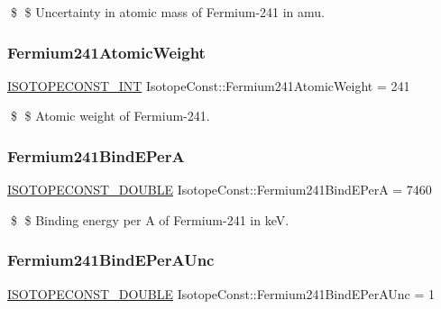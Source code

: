 \$ \$ Uncertainty in atomic mass of Fermium-\/241 in amu. \mbox{\label{group___isotope_const-_fermium-_fm241_gac48969b95bcbb3997af04f0e85ccc840}} 
\subsubsection{\texorpdfstring{Fermium241\+Atomic\+Weight}{Fermium241AtomicWeight}}
{\footnotesize\ttfamily \mbox{\hyperlink{group___isotope_const-_macros_ga5f18360b3e99483a35c32d789e62621c}{I\+S\+O\+T\+O\+P\+E\+C\+O\+N\+S\+T\+\_\+\+I\+NT}} Isotope\+Const\+::\+Fermium241\+Atomic\+Weight = 241}

\$ \$ Atomic weight of Fermium-\/241. \mbox{\label{group___isotope_const-_fermium-_fm241_gaf63ced322a4c28c53a291984f1794c68}} 
\subsubsection{\texorpdfstring{Fermium241\+Bind\+E\+PerA}{Fermium241BindEPerA}}
{\footnotesize\ttfamily \mbox{\hyperlink{group___isotope_const-_macros_ga8f45a7272ce02c0b4c65c44636ed719a}{I\+S\+O\+T\+O\+P\+E\+C\+O\+N\+S\+T\+\_\+\+D\+O\+U\+B\+LE}} Isotope\+Const\+::\+Fermium241\+Bind\+E\+PerA = 7460}

\$ \$ Binding energy per A of Fermium-\/241 in keV. \mbox{\label{group___isotope_const-_fermium-_fm241_gabebbb0cd97944c54dd296b98ab654b13}} 
\subsubsection{\texorpdfstring{Fermium241\+Bind\+E\+Per\+A\+Unc}{Fermium241BindEPerAUnc}}
{\footnotesize\ttfamily \mbox{\hyperlink{group___isotope_const-_macros_ga8f45a7272ce02c0b4c65c44636ed719a}{I\+S\+O\+T\+O\+P\+E\+C\+O\+N\+S\+T\+\_\+\+D\+O\+U\+B\+LE}} Isotope\+Const\+::\+Fermium241\+Bind\+E\+Per\+A\+Unc = 1}

